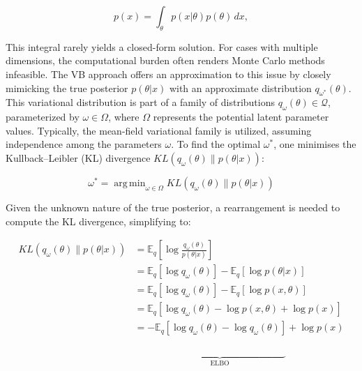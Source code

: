 \documentclass[3p,review,authoryear]{elsarticle}
\DeclareMathOperator*{\argmin}{arg\,min}
\begin{document}
\begin{equation}
p(x)=\int_{\theta} p(x|\theta)p(\theta) \,dx,
\label{eq:evidence}
\end{equation}

This integral rarely yields a closed-form solution.
For cases with multiple dimensions, the computational burden often renders Monte Carlo methods infeasible.
The VB approach offers an approximation to this issue by closely mimicking the true posterior $p(\theta|x)$ with an approximate distribution $q_{\omega^*}(\theta)$. This variational distribution is part of a family of distributions $q_\omega(\theta)\in \mathcal{Q}$, parameterized by $\omega \in \Omega$, where $\Omega$ represents the potential latent parameter values.
Typically, the mean-field variational family is utilized, assuming independence among the parameters $\omega$. To find the optimal $\omega^*$, one minimises the Kullback–Leibler (KL) divergence $KL(q_\omega(\theta) \parallel p(\theta|x))$:

\begin{equation}
\omega^* = \argmin_{\omega \in \Omega}KL(q_\omega(\theta) \parallel p(\theta|x))
\label{eq:optim}
\end{equation}

Given the unknown nature of the true posterior, a rearrangement is needed to compute the KL divergence, simplifying to:

\begin{align*}
KL(q_\omega(\theta) \parallel p(\theta|x)) &= \mathbb{E}_q\left[\log \frac{q_\omega (\theta)}{p(\theta|x)}\right] \\
&=\mathbb{E}_q\left[\log q_\omega(\theta)\right]-\mathbb{E}_q\left[\log p(\theta|x)\right]\\
&=\mathbb{E}_q\left[\log q_\omega(\theta)\right]-\mathbb{E}_q\left[\log p(x,\theta)\right]\\
&=\mathbb{E}_q[\log q_\omega(\theta) - \log p(x,\theta)+\log p(x)]\\
&=-\mathbb{E}_q\left[\log q_\omega(\theta) - \log q_\omega(\theta)\right] + \log p(x)\\
&\quad \quad \underbrace{\phantom{\mathbb{E}_q\left[\log q_\omega(\theta) - \log q_\omega(\theta)\right]}}_{\text{ELBO}}
\label{eq:kl_divergence}
\end{align*}
\end{document}
